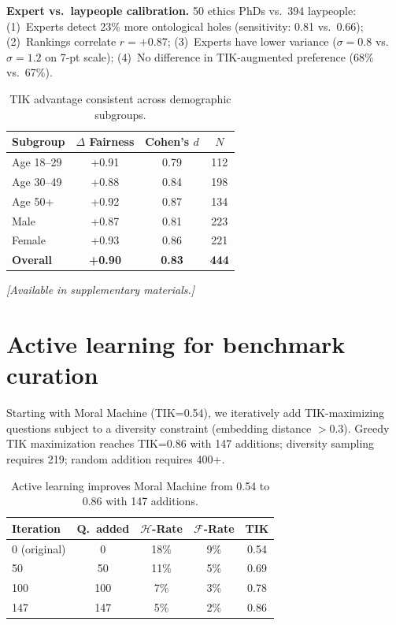 \documentclass[11pt]{article}
\begin{document}
\textbf{Expert vs.\ laypeople calibration.} 50 ethics PhDs vs.\ 394 laypeople: (1)~Experts detect 23\% more ontological holes (sensitivity: 0.81 vs.\ 0.66); (2)~Rankings correlate $r = +0.87$; (3)~Experts have lower variance ($\sigma = 0.8$ vs.\ $\sigma = 1.2$ on 7-pt scale); (4)~No difference in TIK-augmented preference (68\% vs.\ 67\%).

\begin{table}[h]
\centering
\small
\caption{TIK advantage consistent across demographic subgroups.}
\begin{tabular}{lccc}
\toprule
\textbf{Subgroup} & $\Delta$ \textbf{Fairness} & Cohen's $d$ & $N$ \\
\midrule
Age 18--29 & +0.91 & 0.79 & 112 \\
Age 30--49 & +0.88 & 0.84 & 198 \\
Age 50+ & +0.92 & 0.87 & 134 \\
Male & +0.87 & 0.81 & 223 \\
Female & +0.93 & 0.86 & 221 \\
\midrule
\textbf{Overall} & \textbf{+0.90} & \textbf{0.83} & \textbf{444} \\
\bottomrule
\end{tabular}
\end{table}

\textit{[Available in supplementary materials.]}



\section{Active learning for benchmark curation}
\label{app:active}

Starting with Moral Machine (TIK=0.54), we iteratively add TIK-maximizing questions subject to a diversity constraint (embedding distance $> 0.3$). Greedy TIK maximization reaches TIK=0.86 with 147 additions; diversity sampling requires 219; random addition requires 400+.

\begin{table}[h]
\centering
\small
\caption{Active learning improves Moral Machine from 0.54 to 0.86 with 147 additions.}
\begin{tabular}{lcccc}
\toprule
\textbf{Iteration} & \textbf{Q.\ added} & $\mathcal{H}$\textbf{-Rate} & $\mathcal{F}$\textbf{-Rate} & \textbf{TIK} \\
\midrule
0 (original) & 0 & 18\% & 9\% & 0.54 \\
50 & 50 & 11\% & 5\% & 0.69 \\
100 & 100 & 7\% & 3\% & 0.78 \\
147 & 147 & 5\% & 2\% & 0.86 \\
\bottomrule
\end{tabular}
\end{table}
\end{document}
